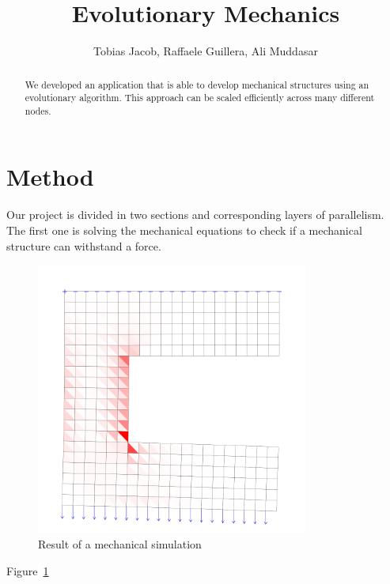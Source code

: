\documentclass[12pt]{article}
\title{Evolutionary Mechanics}
\author{Tobias Jacob, Raffaele Guillera, Ali Muddasar}
\begin{document}
    \maketitle
    \begin{abstract}
        We developed an application that is able to develop mechanical structures using an evolutionary algorithm. This approach can be scaled efficiently across many different nodes.
    \end{abstract}
    \section{Method}
    Our project is divided in two sections and corresponding layers of parallelism. The first one is solving the mechanical equations to check if a mechanical structure can withstand a force.
    \begin{figure}[t]
        \centering
        \includegraphics[width=0.8\textwidth]{images/MechaincalStructure.png}
        \caption{Result of a mechanical simulation}
        \label{fig:Mechanical_Simulation}
    \end{figure}
    Figure~\ref{fig:Mechanical_Simulation} 
\end{document}
